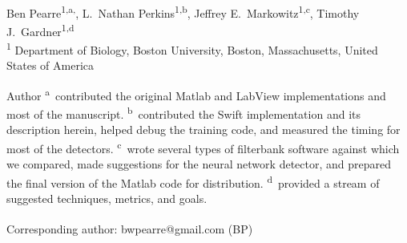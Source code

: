 \documentclass[10pt,letterpaper]{article}
\date{}
\begin{document}
\vspace*{0.35in}

\begin{flushleft}
{\Large
\textbf{}
}
\newline
\\
Ben Pearre\textsuperscript{1,a,\textcurrency},
L.~Nathan Perkins\textsuperscript{1,b},
Jeffrey E.~Markowitz\textsuperscript{1,c},
Timothy J.~Gardner\textsuperscript{1,d}
\\
\bigskip
\textsuperscript{1} Department of Biology, Boston University, Boston, Massachusetts, United States of America
\\
\bigskip

% 
%
Author \textsuperscript{a}~contributed the original Matlab and LabView implementations and most of the manuscript.
\textsuperscript{b}~contributed the Swift implementation and its description herein, helped debug the training code, and measured the timing for most of the detectors.
\textsuperscript{c}~wrote several types of filterbank software against which we compared, made suggestions for the neural network detector, and prepared the final version of the Matlab code for distribution.
\textsuperscript{d}~provided a stream of suggested techniques, metrics, and goals.





\textsuperscript{\textcurrency} Corresponding author: bwpearre@gmail.com (BP)

\end{flushleft}
\end{document}
